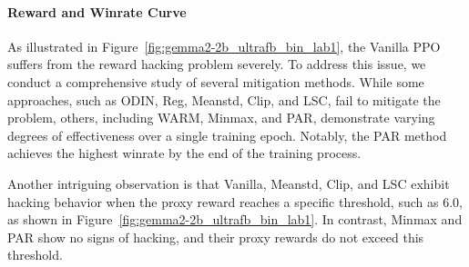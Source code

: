 \paragraph{Reward and Winrate Curve}
As illustrated in Figure~\ref{fig:gemma2-2b_ultrafb_bin_lab1}, the Vanilla PPO suffers from the reward hacking problem severely.
To address this issue, we conduct a comprehensive study of several mitigation methods. While some approaches, such as ODIN, Reg, Meanstd, Clip, and LSC, fail to mitigate the problem, others, including WARM, Minmax, and PAR, demonstrate varying degrees of effectiveness over a single training epoch. Notably, the PAR method achieves the highest winrate by the end of the training process.

Another intriguing observation is that Vanilla, Meanstd, Clip, and LSC exhibit hacking behavior when the proxy reward reaches a specific threshold, such as 6.0, as shown in Figure~\ref{fig:gemma2-2b_ultrafb_bin_lab1}. In contrast, Minmax and PAR show no signs of hacking, and their proxy rewards do not exceed this threshold.

